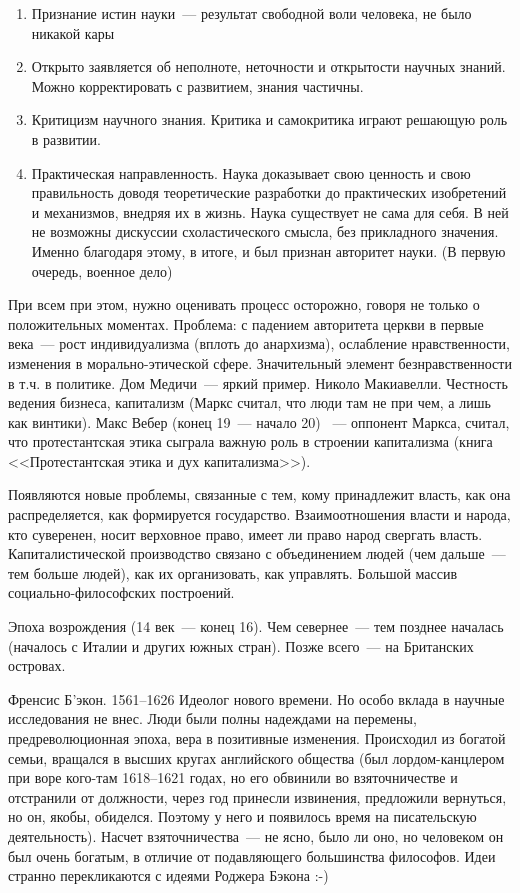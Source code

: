 \begin{enumerate}
	\item Признание истин науки~--- результат свободной воли человека, не было никакой кары
	\item Открыто заявляется об неполноте, неточности и открытости научных знаний. Можно корректировать с развитием, знания частичны.
	\item Критицизм научного знания. Критика и самокритика играют решающую роль в развитии.
	\item Практическая направленность. Наука доказывает свою ценность и свою правильность доводя теоретические разработки до практических изобретений и механизмов, внедряя их в жизнь. Наука существует не сама для себя. В ней не возможны дискуссии схоластического смысла, без прикладного значения. Именно благодаря этому, в итоге, и был признан авторитет науки. (В первую очередь, военное дело) 
\end{enumerate}
При всем при этом, нужно оценивать процесс осторожно, говоря не только о положительных моментах. Проблема: с падением авторитета церкви в первые века~--- рост индивидуализма (вплоть до анархизма), ослабление нравственности, изменения в морально-этической сфере. Значительный элемент безнравственности в т.ч. в политике. Дом Медичи~--- яркий пример. Николо Макиавелли.
Честность ведения бизнеса, капитализм (Маркс считал, что люди там не при чем, а лишь как винтики). Макс Вебер (конец 19~--- начало 20) ~--- оппонент Маркса, считал, что протестантская этика сыграла важную роль в строении капитализма (книга <<Протестантская этика и дух капитализма>>). 

Появляются новые проблемы, связанные с тем, кому принадлежит власть, как она распределяется, как формируется государство. Взаимоотношения власти и народа, кто суверенен, носит верховное право, имеет ли право народ свергать власть. Капиталистической производство связано с объединением людей (чем дальше~--- тем больше людей), как их организовать, как управлять. Большой массив социально-философских построений.

Эпоха возрождения (14 век~--- конец 16). Чем севернее~--- тем позднее началась (началось с Италии и других южных стран). Позже всего~--- на Британских островах.

Френсис Б'экон. 1561--1626
Идеолог нового времени. Но особо вклада в научные исследования не внес. Люди были полны надеждами на перемены, предреволюционная эпоха, вера в позитивные изменения. Происходил из богатой семьи, вращался в высших кругах английского общества (был лордом-канцлером при воре кого-там 1618--1621 годах, но его обвинили во взяточничестве и отстранили от должности, через год принесли извинения, предложили вернуться, но он, якобы, обиделся. Поэтому у него и появилось время на писательскую деятельность). Насчет взяточничества~--- не ясно, было ли оно, но человеком он был очень богатым, в отличие от подавляющего большинства философов. Идеи странно перекликаются с идеями Роджера Бэкона :-) 

